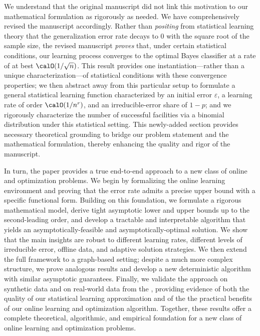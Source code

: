 \documentclass[11pt]{article}
\begin{document}
We understand that the original manuscript did not link this motivation to our mathematical formulation as rigorously as needed. We have comprehensively revised the manuscript accordingly. Rather than \textit{positing} from statistical learning theory that the generalization error rate decays to 0 with the square root of the sample size, the revised manuscript \textit{proves} that, under certain statistical conditions, our learning process converges to the optimal Bayes classifier at a rate of at best $\calO(1/\sqrt{n})$. This result provides one instantiation—rather than a unique characterization—of statistical conditions with these convergence properties; we then abstract away from this particular setup to formulate a general statistical learning function characterized by an initial error $\varepsilon$, a learning rate of order $\calO(1/n^{r})$, and an irreducible-error share of $1-p$; and we rigorously characterize the number of successful facilities via a binomial distribution under this statistical setting. This newly-added section provides necessary theoretical grounding to bridge our problem statement and the mathematical formulation, thereby enhancing the quality and rigor of the manuscript.

In turn, the paper provides a true end-to-end approach to a new class of online and optimization problems. We begin by formalizing the online learning environment and proving that the error rate admits a precise upper bound with a specific functional form. Building on this foundation, we formulate a rigorous mathematical model, derive tight asymptotic lower and upper bounds up to the second-leading order, and develop a tractable and interpretable algorithm that yields an asymptotically-feasible and asymptotically-optimal solution. We show that the main insights are robust to different learning rates, different levels of irreducible error, offline data, and adaptive solution strategies. We then extend the full framework to a graph-based setting; despite a much more complex structure, we prove analogous results and develop a new deterministic algorithm with similar asymptotic guarantees. Finally, we validate the approach on synthetic data and on real-world data from the \cite{UCI}, providing evidence of both the quality of our statistical learning approximation and of the the practical benefits of our online learning and optimization algorithm. Together, these results offer a complete theoretical, algorithmic, and empirical foundation for a new class of online learning and optimization problems.
\end{document}
